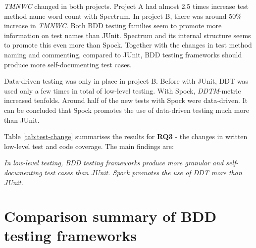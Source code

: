 \textit{TMNWC} changed in both projects. Project A had almost 2.5 times increase test method name word count with Spectrum. In
project B, there was around 50\% increase in \textit{TMNWC}. Both BDD testing families seem to promote more information on test
names than JUnit. Spectrum and its internal structure seems to promote this even more than Spock. Together with the changes
in test method naming and commenting, compared to JUnit, BDD testing frameworks should produce more self-documenting test cases.

Data-driven testing was only in place in project B. Before with JUnit, DDT was used only a few times in total
of low-level testing. With Spock, \textit{DDTM}-metric increased tenfolds. Around half of the new tests with Spock were data-driven.
It can be concluded that Spock promotes the use of data-driven testing much more than JUnit.

Table \ref{tab:test-change} summarises the results for \textbf{RQ3} - the changes in written low-level test and code coverage.
The main findings are:

\begin{center}
\begin{topbot}
\textit{In low-level testing, BDD testing frameworks produce more granular and self-documenting test cases than JUnit.
Spock promotes the use of DDT more than JUnit.}
\end{topbot}
\end{center}

\section{Comparison summary of BDD testing frameworks}

